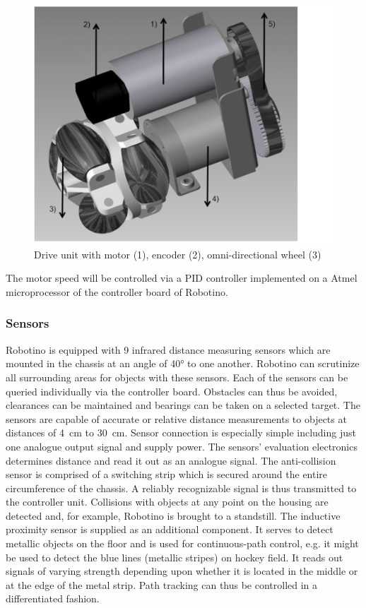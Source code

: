\documentclass[12pt,twoside]{article}
\begin{document}
\begin{appendix}
\begin{figure}[tbh]
\centering
\includegraphics{driveunit.png}
\caption{Drive unit with motor (1), encoder (2), omni-directional wheel
(3)}
\label{apx:fig:driveunit}
\end{figure}

The motor speed will be controlled via a PID controller implemented on
a Atmel microprocessor of the controller board of Robotino.

\subsubsection{Sensors}

Robotino is equipped with 9 infrared distance measuring sensors which
are mounted in the chassis at an angle of \ang{40} to one
another. Robotino can scrutinize all surrounding areas for objects
with these sensors.  Each of the sensors can be queried individually
via the controller board. Obstacles can thus be avoided, clearances
can be maintained and bearings can be taken on a selected target. The
sensors are capable of accurate or relative distance measurements to
objects at distances of \SI{4}{\centi\metre} to
\SI{30}{\centi\metre}. Sensor connection is especially simple
including just one analogue output signal and supply power. The
sensors' evaluation electronics determines distance and read it out as
an analogue signal.  The anti-collision sensor is comprised of a
switching strip which is secured around the entire circumference of
the chassis. A reliably recognizable signal is thus transmitted to the
controller unit.  Collisions with objects at any point on the housing
are detected and, for example, Robotino is brought to a
standstill. The inductive proximity sensor is supplied as an
additional component. It serves to detect metallic objects on the
floor and is used for continuous-path control, e.g. it might be used
to detect the blue lines (metallic stripes) on hockey field. It reads
out signals of varying strength depending upon whether it is located
in the middle or at the edge of the metal strip. Path tracking can
thus be controlled in a differentiated fashion.


\end{appendix}
\end{document}
